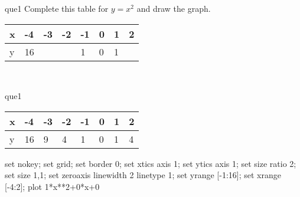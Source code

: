 \documentclass[13.5pt, varwidth=true]{beamer}
\begin{document}
\begin{frame}[shrink=19,fragile]
	\begin{beamercolorbox}[rounded=true, left, shadow=true,wd=14.8cm]{que1}
		 Complete this table for $y = x^{2}$ and draw the graph. \\[0.3cm] \renewcommand{\arraystretch}{1.2}\begin{tabular}{|C|C|C|C|C|C|C|C|} \hline x & -4 & -3 & -2 & -1 & 0 & 1 & 2 \\ \hline y & 16 &  &  & 1 & 0 & 1 & \\ \hline \end{tabular}\\[0.3cm]
	\end{beamercolorbox}
\end{frame}
\begin{frame}[shrink=19,fragile]
	\begin{beamercolorbox}[rounded=true, left, shadow=true,wd=14.8cm]{que1}
		\renewcommand{\arraystretch}{1.2}\begin{tabular}{|C|C|C|C|C|C|C|C|} \hline x & -4 & -3 & -2 & -1 & 0 & 1 & 2 \\ \hline y & 16 & 9 & 4 & 1 & 0 & 1 & 4\\ \hline \end{tabular}\begin{gnuplot}[terminal=pdf] set nokey; set grid; set border 0; set xtics axis 1; set ytics axis 1; set size ratio 2; set size 1,1; set zeroaxis linewidth 2 linetype 1; set yrange [-1:16]; set xrange [-4:2]; plot 1*x**2+0*x+0 \end{gnuplot}
	\end{beamercolorbox}
\end{frame}
\end{document}

